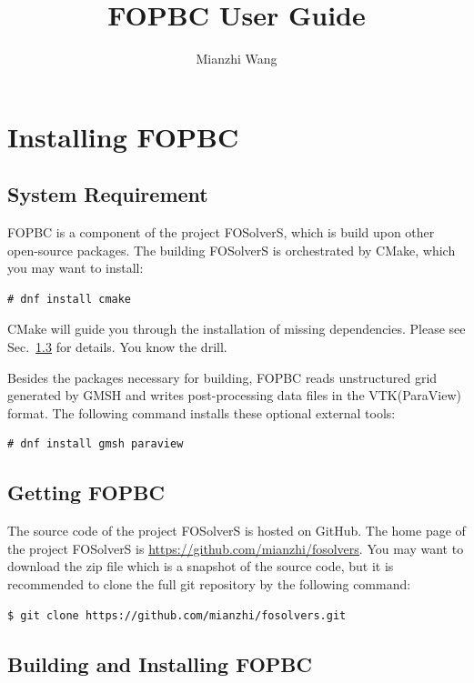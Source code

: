 \documentclass[]{article}
\title{FOPBC User Guide}
\author{Mianzhi Wang}
\begin{document}
\maketitle

\tableofcontents

\section{Installing FOPBC}

\subsection{System Requirement}
\label{sec:requirement}

FOPBC is a component of the project FOSolverS, which is build upon other open-source packages.
The building FOSolverS is orchestrated by CMake, which you may want to install:
\begin{lstlisting}[backgroundcolor=\color{lightgray}]
  # dnf install cmake
\end{lstlisting}

CMake will guide you through the installation of missing dependencies.
Please see Sec.~\ref{sec:building} for details.
You know the drill. 

Besides the packages necessary for building, FOPBC reads unstructured grid generated by GMSH and
writes post-processing data files in the VTK(ParaView) format.
The following command installs these optional external tools:
\begin{lstlisting}[backgroundcolor=\color{lightgray}]
  # dnf install gmsh paraview
\end{lstlisting}

\subsection{Getting FOPBC}
\label{sec:getting}

The source code of the project FOSolverS is hosted on GitHub.
The home page of the project FOSolverS is \url{https://github.com/mianzhi/fosolvers}.
You may want to download the zip file which is a snapshot of the source code, but it is recommended
to clone the full git repository by the following command:
\begin{lstlisting}[backgroundcolor=\color{lightgray}]
  $ git clone https://github.com/mianzhi/fosolvers.git
\end{lstlisting}

\subsection{Building and Installing FOPBC}
\label{sec:building}
\end{document}
